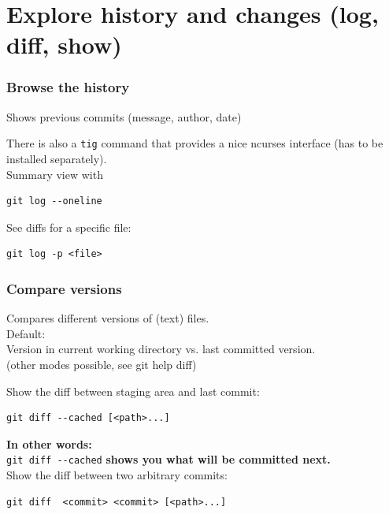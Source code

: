 \documentclass{gittalk}
\newcommand{\hlcommand}[1]{ %
\colorbox{base3}{\small \texttt{#1}}
}
\begin{document}
\section{Explore history and changes (log, diff, show)}

\begin{frame}[fragile]
\frametitle{Browse the history}
\begin{tcolorbox}[title=git log]
Shows previous commits (message, author, date)
\end{tcolorbox}
\vspace*{1em}
There is also a \hlcommand{tig} command that provides a nice ncurses interface
(has to be installed separately).\\[1em]
Summary view with
\begin{lstlisting}[basicstyle=\normalsize\ttfamily]
git log --oneline
\end{lstlisting}
\vspace*{1em}
See diffs for a specific file:
\begin{lstlisting}[basicstyle=\normalsize\ttfamily]
git log -p <file>
\end{lstlisting}
\end{frame}

\begin{frame}[fragile]
\frametitle{Compare versions}
\begin{tcolorbox}[title=git diff]
Compares different versions of (text) files.\\[0.5em]
Default:\\Version in current working directory vs. last committed version.\\
(other modes possible, see git help diff)
\end{tcolorbox}
\vspace*{1em}
Show the diff between staging area and last commit:
\begin{lstlisting}[basicstyle=\normalsize\ttfamily]
git diff --cached [<path>...]
\end{lstlisting}
\textbf{In other words:}\\
\hlcommand{git diff -{}-cached} \textbf{shows you what will be committed next.}\\[1em]
Show the diff between two arbitrary commits:
\begin{lstlisting}[basicstyle=\normalsize\ttfamily]
git diff  <commit> <commit> [<path>...]
\end{lstlisting}

\vspace*{1em}

\end{frame}
\end{document}
